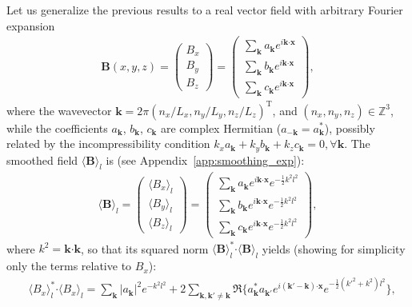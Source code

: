 \documentclass[]{article}
\newcommand{\bcdot}{\bm{\cdot}}
\begin{document}
Let us generalize the previous results to a real vector field with arbitrary Fourier expansion
%
\begin{align}
	\bm B (x,y,z) = \begin{pmatrix}
		B_x \\ B_y \\ B_z
	\end{pmatrix} = \begin{pmatrix}
		\sum_{\bm k} a_{\bm k} e^{i \bm k \bcdot\bm x }  \\ \sum_{\bm k} b_{\bm k} e^{i \bm k \bcdot\bm x } \\ \sum_{\bm k} c_{\bm k} e^{i \bm k \bcdot\bm x }
	\end{pmatrix},
\end{align}
%
where the wavevector $\bm k = 2 \pi \left(n_x/L_x, n_y/L_y, n_z/L_z \right)^\mathrm{T}$, and $\left(n_x, n_y, n_z \right) \in \mathbb{Z}^3$, while the coefficients $a_{\bm k}$, $b_{\bm k}$, $c_{\bm k}$ are complex Hermitian ($a_{-\bm k} = a_{\bm k}^*$), possibly related by the incompressibility condition $k_x a_{\bm k} + k_y b_{\bm k} + k_z c_{\bm k} = 0, \forall \bm k$. 
The smoothed field $\langle \bm B \rangle_l$ is (see Appendix~\ref{app:smoothing_exp}):
%
\begin{align}
	\langle \bm B \rangle_l = \begin{pmatrix}
		\langle B_x \rangle_l \\ \langle B_y \rangle_l \\ \langle B_z \rangle_l
	\end{pmatrix} = \begin{pmatrix}
		\sum_{\bm k} a_{\bm k} e^{i \bm k \bcdot\bm x } e^{-\frac{1}{2} k^2 l^2}   \\ \sum_{\bm k} b_{\bm k} e^{i \bm k \bcdot\bm x } e^{-\frac{1}{2} k^2 l^2}  \\ \sum_{\bm k} c_{\bm k} e^{i \bm k \bcdot\bm x } e^{-\frac{1}{2} k^2 l^2} 
	\end{pmatrix},
\end{align}
%
where $k^2 = \bm k \bcdot\bm k$, so that its squared norm $\langle \bm B \rangle_l^* \bcdot\langle \bm B \rangle_l$ yields (showing for simplicity only the terms relative to $B_x$):
%
\begin{align}
	&\langle B_x \rangle_l^* \bcdot\langle B_x \rangle_l  = \sum_{\bm k} |a_{\bm k}|^2 e^{- k^2 l^2} + 2 \sum_{\bm k, \bm k' \neq \bm k} \Re \lbrace a_{\bm k}^* a_{\bm k'} e^{i (\bm k' - \bm k) \bcdot\bm x } e^{-\frac{1}{2} (k'^2 + k^2) l^2} \rbrace,
\end{align}
\end{document}
